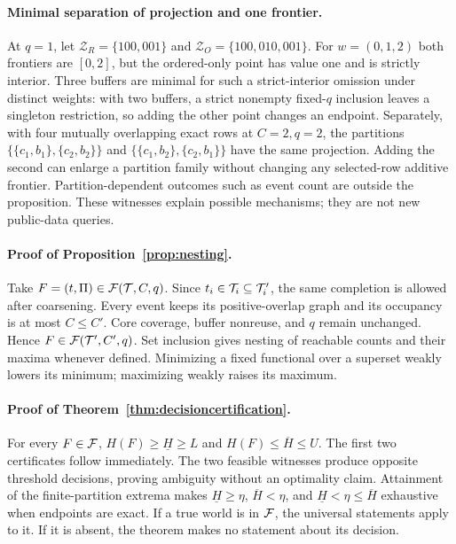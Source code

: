 \paragraph{Minimal separation of projection and one frontier.}
At $q=1$, let $\mathcal Z_R=\{100,001\}$ and
$\mathcal Z_O=\{100,010,001\}$. For $w=(0,1,2)$ both frontiers are $[0,2]$,
but the ordered-only point has value one and is strictly interior. Three
buffers are minimal for such a strict-interior omission under distinct
weights: with two buffers, a strict nonempty fixed-$q$ inclusion leaves a
singleton restriction, so adding the other point changes an endpoint.
Separately, with four mutually overlapping exact rows at $C=2,q=2$, the partitions
$\{\{c_1,b_1\},\{c_2,b_2\}\}$ and
$\{\{c_1,b_2\},\{c_2,b_1\}\}$ have the same projection. Adding the second
can enlarge a partition family without changing any selected-row additive
frontier. Partition-dependent outcomes such as event count are outside the
proposition. These witnesses explain possible mechanisms; they are not new
public-data queries.

\paragraph{Proof of Proposition~\ref{prop:nesting}.}
Take $F=(t,\Pi)\in\mathcal F(\mathcal T,C,q)$. Since $t_i\in\mathcal T_i\subseteq\mathcal T'_i$, the
same completion is allowed after coarsening. Every event keeps its
positive-overlap graph and its occupancy is at most $C\le C'$. Core coverage,
buffer nonreuse, and $q$ remain unchanged. Hence
$F\in\mathcal F(\mathcal T',C',q)$. Set inclusion gives nesting of reachable counts and their
maxima whenever defined. Minimizing a fixed functional over a superset weakly
lowers its minimum; maximizing weakly raises its maximum.

\paragraph{Proof of Theorem~\ref{thm:decisioncertification}.}
For every $F\in\mathcal F$, $H(F)\ge\underline H\ge L$ and
$H(F)\le\overline H\le U$. The first two certificates follow immediately.
The two feasible witnesses produce opposite threshold decisions, proving
ambiguity without an optimality claim. Attainment of the finite-partition
extrema makes $\underline H\ge\eta$, $\overline H<\eta$, and
$\underline H<\eta\le\overline H$ exhaustive when endpoints are exact. If a
true world is in $\mathcal F$, the universal statements apply to it. If it is absent,
the theorem makes no statement about its decision.

